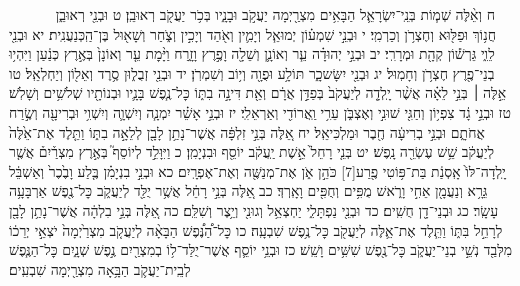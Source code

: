 \documentclass[twoside, openany, parskip=half, 11pt]{book}
\begin{document}
　　　 ח וְאֵ֨לֶּה שְׁמ֧וֹת בְּנֵֽי־יִשְׂרָאֵ֛ל הַבָּאִ֥ים מִצְרַ֖יְמָה יַעֲקֹ֣ב וּבָנָ֑יו בְּכֹ֥ר יַעֲקֹ֖ב רְאוּבֵֽן׃ ט וּבְנֵ֖י רְאוּבֵ֑ן חֲנ֥וֹךְ וּפַלּ֖וּא וְחֶצְרֹ֥ן וְכַרְמִֽי׃ י וּבְנֵ֣י שִׁמְע֗וֹן יְמוּאֵ֧ל וְיָמִ֛ין וְאֹ֖הַד וְיָכִ֣ין וְצֹ֑חַר וְשָׁא֖וּל בֶּן־הַֽכְּנַעֲנִֽית׃ יא וּבְנֵ֖י לֵוִ֑י גֵּרְשׁ֕וֹן קְהָ֖ת וּמְרָרִֽי׃ יב וּבְנֵ֣י יְהוּדָ֗ה עֵ֧ר וְאוֹנָ֛ן וְשֵׁלָ֖ה וָפֶ֣רֶץ וָזָ֑רַח וַיָּ֨מׇת עֵ֤ר וְאוֹנָן֙ בְּאֶ֣רֶץ כְּנַ֔עַן וַיִּהְי֥וּ בְנֵי־פֶ֖רֶץ חֶצְרֹ֥ן וְחָמֽוּל׃ יג וּבְנֵ֖י יִשָּׂשכָ֑ר תּוֹלָ֥ע וּפֻוָ֖ה וְי֥וֹב וְשִׁמְרֹֽן׃ יד וּבְנֵ֖י זְבֻל֑וּן סֶ֥רֶד וְאֵל֖וֹן וְיַחְלְאֵֽל׃ טו אֵ֣לֶּה ׀ בְּנֵ֣י לֵאָ֗ה אֲשֶׁ֨ר יָֽלְדָ֤ה לְיַעֲקֹב֙ בְּפַדַּ֣ן אֲרָ֔ם וְאֵ֖ת דִּינָ֣ה בִתּ֑וֹ כׇּל־נֶ֧פֶשׁ בָּנָ֛יו וּבְנוֹתָ֖יו שְׁלֹשִׁ֥ים וְשָׁלֹֽשׁ׃ טז וּבְנֵ֣י גָ֔ד צִפְי֥וֹן וְחַגִּ֖י שׁוּנִ֣י וְאֶצְבֹּ֑ן עֵרִ֥י וַֽאֲרוֹדִ֖י וְאַרְאֵלִֽי׃ יז וּבְנֵ֣י אָשֵׁ֗ר יִמְנָ֧ה וְיִשְׁוָ֛ה וְיִשְׁוִ֥י וּבְרִיעָ֖ה וְשֶׂ֣רַח אֲחֹתָ֑ם וּבְנֵ֣י בְרִיעָ֔ה חֶ֖בֶר וּמַלְכִּיאֵֽל׃ יח אֵ֚לֶּה בְּנֵ֣י זִלְפָּ֔ה אֲשֶׁר־נָתַ֥ן לָבָ֖ן לְלֵאָ֣ה בִתּ֑וֹ וַתֵּ֤לֶד אֶת־אֵ֙לֶּה֙ לְיַעֲקֹ֔ב שֵׁ֥שׁ עֶשְׂרֵ֖ה נָֽפֶשׁ׃ יט בְּנֵ֤י רָחֵל֙ אֵ֣שֶׁת יַֽעֲקֹ֔ב יוֹסֵ֖ף וּבִנְיָמִֽן׃ כ וַיִּוָּלֵ֣ד לְיוֹסֵף֮ בְּאֶ֣רֶץ מִצְרַ֒יִם֒ אֲשֶׁ֤ר יָֽלְדָה־לּוֹ֙ אָֽסְנַ֔ת בַּת־פּ֥וֹטִי פֶ֖רַע‏[7] כֹּהֵ֣ן אֹ֑ן אֶת־מְנַשֶּׁ֖ה וְאֶת־אֶפְרָֽיִם׃ כא וּבְנֵ֣י בִנְיָמִ֗ן בֶּ֤לַע וָבֶ֙כֶר֙ וְאַשְׁבֵּ֔ל גֵּרָ֥א וְנַעֲמָ֖ן אֵחִ֣י וָרֹ֑אשׁ מֻפִּ֥ים וְחֻפִּ֖ים וָאָֽרְדְּ׃ כב אֵ֚לֶּה בְּנֵ֣י רָחֵ֔ל אֲשֶׁ֥ר יֻלַּ֖ד לְיַעֲקֹ֑ב כׇּל־נֶ֖פֶשׁ אַרְבָּעָ֥ה עָשָֽׂר׃ כג וּבְנֵי־דָ֖ן חֻשִֽׁים׃ כד וּבְנֵ֖י נַפְתָּלִ֑י יַחְצְאֵ֥ל וְגוּנִ֖י וְיֵ֥צֶר וְשִׁלֵּֽם׃ כה אֵ֚לֶּה בְּנֵ֣י בִלְהָ֔ה אֲשֶׁר־נָתַ֥ן לָבָ֖ן לְרָחֵ֣ל בִּתּ֑וֹ וַתֵּ֧לֶד אֶת־אֵ֛לֶּה לְיַעֲקֹ֖ב כׇּל־נֶ֥פֶשׁ שִׁבְעָֽה׃ כו כׇּל־הַ֠נֶּ֠פֶשׁ הַבָּאָ֨ה לְיַעֲקֹ֤ב מִצְרַ֙יְמָה֙ יֹצְאֵ֣י יְרֵכ֔וֹ מִלְּבַ֖ד נְשֵׁ֣י בְנֵי־יַעֲקֹ֑ב כׇּל־נֶ֖פֶשׁ שִׁשִּׁ֥ים וָשֵֽׁשׁ׃ כז וּבְנֵ֥י יוֹסֵ֛ף אֲשֶׁר־יֻלַּד־ל֥וֹ בְמִצְרַ֖יִם נֶ֣פֶשׁ שְׁנָ֑יִם כׇּל־הַנֶּ֧פֶשׁ לְבֵֽית־יַעֲקֹ֛ב הַבָּ֥אָה מִצְרַ֖יְמָה שִׁבְעִֽים׃
\end{document}
